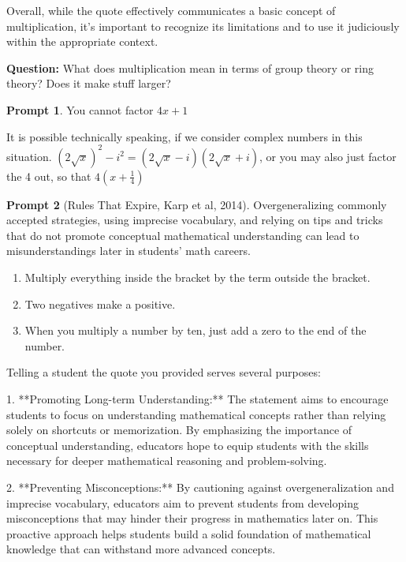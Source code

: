 \documentclass[11pt]{article}
\theoremstyle{definition}\newtheorem{definition}{Definition}
\theoremstyle{definition}\newtheorem{question}{Question}
\theoremstyle{definition}\newtheorem*{solution}{Solution}
\theoremstyle{definition}\newtheorem{example}{Example}
\theoremstyle{definition}\newtheorem{notation}{Notation}
\theoremstyle{theorem}\newtheorem{theorem}{Theorem}
\theoremstyle{theorem}\newtheorem{corollary}{Corollary}
\theoremstyle{theorem}\newtheorem{lemma}{Lemma}
\theoremstyle{theorem}\newtheorem{proposition}{Proposition}
\theoremstyle{theorem}\newtheorem{prompt}{Prompt}
\begin{document}
Overall, while the quote effectively communicates a basic concept of multiplication, it's important to recognize its limitations and to use it judiciously within the appropriate context.

\textbf{Question:} What does multiplication mean in terms of group theory or ring theory? Does it make stuff larger?

\color{black}

\begin{prompt}
    You cannot factor $4x + 1$
\end{prompt}

\color{teal}

It is possible technically speaking, if we consider complex numbers in this situation. $(2\sqrt{x})^2 - i^2 = (2\sqrt{x} - i)(2\sqrt{x} + i)$, or you may also just factor the 4 out, so that $4\left(x + \frac{1}{4}\right)$

\color{black}

\begin{prompt}[Rules That Expire, Karp et al, 2014]
    Overgeneralizing commonly accepted strategies, using imprecise vocabulary, and relying on tips and tricks that do not promote conceptual mathematical understanding can lead to misunderstandings later in students' math careers.
\end{prompt}

\begin{enumerate}
    \item Multiply everything inside the bracket by the term outside the bracket.
    \item Two negatives make a positive.
    \item When you multiply a number by ten, just add a zero to the end of the number.
\end{enumerate}

\color{teal}

Telling a student the quote you provided serves several purposes:

1. **Promoting Long-term Understanding:** The statement aims to encourage students to focus on understanding mathematical concepts rather than relying solely on shortcuts or memorization. By emphasizing the importance of conceptual understanding, educators hope to equip students with the skills necessary for deeper mathematical reasoning and problem-solving.

2. **Preventing Misconceptions:** By cautioning against overgeneralization and imprecise vocabulary, educators aim to prevent students from developing misconceptions that may hinder their progress in mathematics later on. This proactive approach helps students build a solid foundation of mathematical knowledge that can withstand more advanced concepts.
\end{document}
